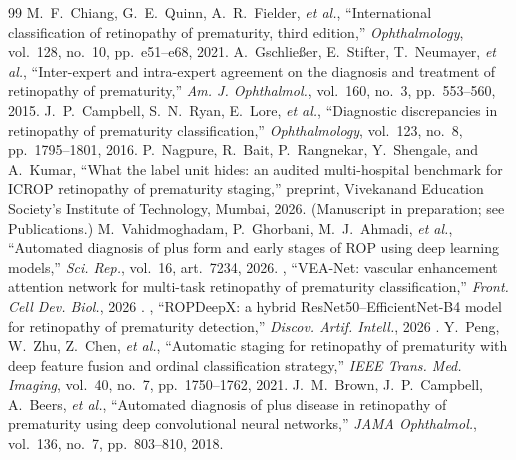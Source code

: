 \clearpage
\begingroup
\renewcommand{\bibname}{Literature Cited}
\titlespacing*{\chapter}{0pt}{0pt}{12mm}
\begin{thebibliography}{99}
M.~F.~Chiang, G.~E.~Quinn, A.~R.~Fielder, \emph{et al.}, ``International classification of retinopathy of prematurity, third edition,'' \emph{Ophthalmology}, vol.~128, no.~10, pp.~e51--e68, 2021.
A.~Gschlie\ss{}er, E.~Stifter, T.~Neumayer, \emph{et al.}, ``Inter-expert and intra-expert agreement on the diagnosis and treatment of retinopathy of prematurity,'' \emph{Am. J. Ophthalmol.}, vol.~160, no.~3, pp.~553--560, 2015.
J.~P.~Campbell, S.~N.~Ryan, E.~Lore, \emph{et al.}, ``Diagnostic discrepancies in retinopathy of prematurity classification,'' \emph{Ophthalmology}, vol.~123, no.~8, pp.~1795--1801, 2016.
%
P.~Nagpure, R.~Bait, P.~Rangnekar, Y.~Shengale, and A.~Kumar, ``What the label unit hides: an audited multi-hospital benchmark for ICROP retinopathy of prematurity staging,'' preprint, Vivekanand Education Society's Institute of Technology, Mumbai, 2026. (Manuscript in preparation; see Publications.)
M.~Vahidmoghadam, P.~Ghorbani, M.~J.~Ahmadi, \emph{et al.}, ``Automated diagnosis of plus form and early stages of ROP using deep learning models,'' \emph{Sci. Rep.}, vol.~16, art.~7234, 2026.
, ``VEA-Net: vascular enhancement attention network for multi-task retinopathy of prematurity classification,'' \emph{Front. Cell Dev. Biol.}, 2026 .
, ``ROPDeepX: a hybrid ResNet50--EfficientNet-B4 model for retinopathy of prematurity detection,'' \emph{Discov. Artif. Intell.}, 2026 .
Y.~Peng, W.~Zhu, Z.~Chen, \emph{et al.}, ``Automatic staging for retinopathy of prematurity with deep feature fusion and ordinal classification strategy,'' \emph{IEEE Trans. Med. Imaging}, vol.~40, no.~7, pp.~1750--1762, 2021.
J.~M.~Brown, J.~P.~Campbell, A.~Beers, \emph{et al.}, ``Automated diagnosis of plus disease in retinopathy of prematurity using deep convolutional neural networks,'' \emph{JAMA Ophthalmol.}, vol.~136, no.~7, pp.~803--810, 2018.

\end{thebibliography}
